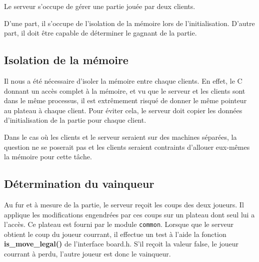 Le serveur s'occupe de gérer une partie jouée par deux clients. 

D'une part, il s'occupe de l'isolation de la mémoire lors de l'initialisation.
D'autre part, il doit être capable de déterminer le gagnant de la partie.


\subsection{Isolation de la mémoire}
Il nous a été nécessaire d'isoler la mémoire entre chaque clients.
En effet, le C donnant un accès complet à la mémoire, et vu que le serveur et les clients
sont dans le même processus, il est extrêmement risqué de donner le même pointeur au plateau à chaque client.
Pour éviter cela, le serveur doit copier les données d'initialisation de la partie pour chaque client.

Dans le cas où les clients et le serveur seraient sur des machines séparées, 
la question ne se poserait pas et les clients seraient contraints
d'allouer eux-mêmes la mémoire pour cette tâche.

\subsection{Détermination du vainqueur}
Au fur et à mesure de la partie, le serveur reçoit les coups des deux joueurs.
Il applique les modifications engendrées par ces coups sur un plateau dont seul lui a l'accès.
Ce plateau est fourni par le module \verb|common|. Lorsque que le serveur obtient le coup 
du joueur courrant, il effectue un test à l'aide la fonction \textbf{is\_move\_legal()} de l'interface board.h.
S'il reçoit la valeur false, le joueur courrant à perdu, l'autre joueur est donc le vainqueur.